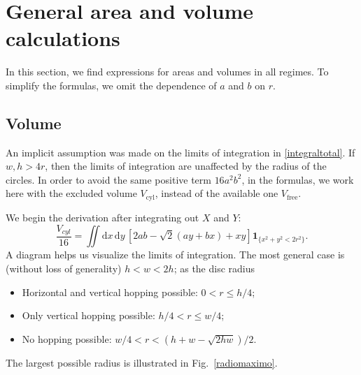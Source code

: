 \documentclass[superscriptaddress,pre,reprint,showpacs,twocolumn]{revtex4-1}
\newcommand{\rd}[1]{\mathrm{d}{#1} \,}
\newcommand{\indicatorsymbol}{\mathbf{1}}
\newcommand{\indicator}[1]{\indicatorsymbol_{ \{   #1 \} } }
\begin{document}




\appendix
\section{General area and volume calculations}
\label{app:area_volume}

In this section, we find expressions for areas and volumes in all 
regimes.
To simplify the formulas, we omit the dependence
of $a$ and $b$ on $r$.



\subsection{Volume}\label{app:volume}


An implicit assumption was made on the limits of integration
in \eqref{integraltotal}. If $w, h > 4r$, then the limits of integration
are unaffected by the radius of the circles.
In order to avoid the same positive term $16a^2b^2$, 
in the formulas, we work here with
the excluded volume $V_\text{cyl}$, instead of the available one $V_\text{free}$. 


We begin the derivation after integrating out $X$ and $Y$:
\begin{equation}\label{VolumenGeneral}
\frac{V_{cyl}}{16}  =\iint \rd x \rd y \left[ 2ab-\sqrt{2}(ay+bx)+x y \right]
\indicator{x^2+y^2 < 2r^2 }.
\end{equation}
A diagram helps us visualize the limits of integration. The most general
case is (without loss of generality) $h < w < 2h$; as the disc radius 
\begin{itemize}
\item Horizontal and vertical hopping possible: $0 <r \leq h/4$;
\item Only vertical hopping possible: $h/4 < r \leq w/4$;
\item No hopping possible: $w/4 < r < (h+w - \sqrt{2hw}) / 2$.
\end{itemize}
The largest possible radius is illustrated in Fig.~\ref{radiomaximo}.
\end{document}
